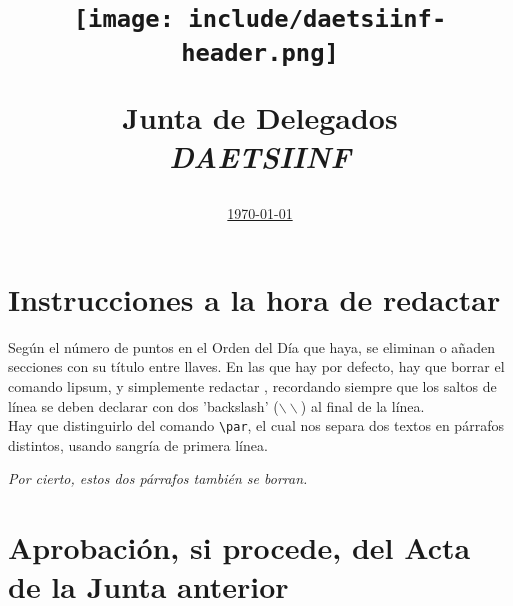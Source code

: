\documentclass[12pt,spanish,a4paper]{article}
\title{
  \begin{flushright}
    \texttt{[image: include/daetsiinf-header.png]}
  \end{flushright}
  \textbf{Junta de Delegados}\\
	\emph{DAETSIINF}}
\author{}
\date{\underline{\today}}
\begin{document}
	\maketitle
	\thispagestyle{empty}
	\renewcommand*\contentsname{Orden del día}
	\tableofcontents
	\pagebreak
    \section*{Instrucciones a la hora de redactar}
      Según el número de puntos en el Orden del Día que haya, se eliminan o añaden secciones con su título entre llaves.
      En las que hay por defecto, hay que borrar el comando lipsum, y simplemente redactar , recordando siempre que los saltos de línea se deben declarar con dos 'backslash' ($\backslash \backslash$) al
      final de la línea. \\
      Hay que distinguirlo del comando \verb=\par=, el cual nos separa dos textos en párrafos distintos, usando sangría de primera línea.\par
      \textit{Por cierto, estos dos párrafos también se borran.}
    \section{Aprobación, si procede, del Acta de la Junta anterior}
      \lipsum[1]
    \newpage
    \section{}
      \lipsum[2]
    \newpage
    \section{}
      \lipsum[3]
    \newpage
    \section{}
      \lipsum[4]
    \newpage
    \section{}
      \lipsum[5]
    \newpage
    \section{}
      \lipsum[6]
    \newpage
\end{document}

